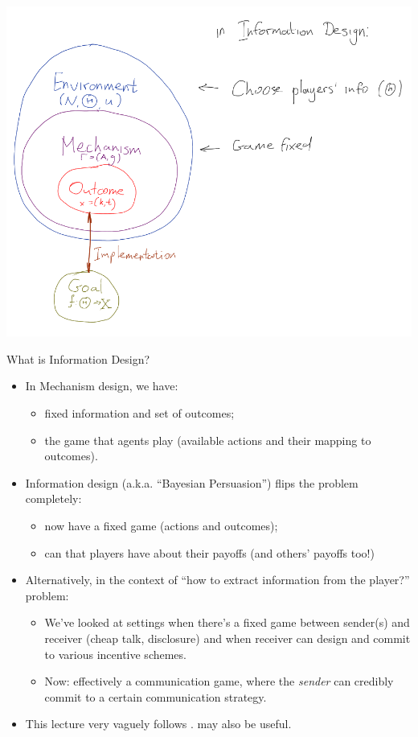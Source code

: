 \documentclass[english,10pt
,aspectratio=169
]{beamer}
\begin{document}
\begin{frame}
	\centering
	\includegraphics[scale=0.32]{pics/M7/MD_vs_ID_3}
\end{frame}


\begin{frame}{What is Information Design?}
\begin{itemize}
	\item In Mechanism design, we have:
	\begin{itemize}
		\item \alert{fixed} information and set of outcomes;
		\item {} the game that agents play (available actions and their mapping to outcomes).
	\end{itemize}
	\item Information design (a.k.a. ``Bayesian Persuasion'') flips the problem completely:
	\begin{itemize}
		\item now have a \alert{fixed game} (actions and outcomes);
		\item can  that players have about their payoffs (and others' payoffs too!)
	\end{itemize}
	\item Alternatively, in the context of ``how to extract information from the player?'' problem:
	\begin{itemize}
		\item We've looked at settings when there's a fixed game between sender(s) and receiver (cheap talk, disclosure) and when receiver can design and commit to various incentive schemes.
		\item Now: effectively a communication game, where the \emph{sender} can credibly commit to a certain communication strategy.
	\end{itemize}
	\item This lecture very vaguely follows \cite{bergemann_information_2019}. \cite{kamenica_bayesian_2019} may also be useful.
\end{itemize}
\end{frame}
\end{document}
